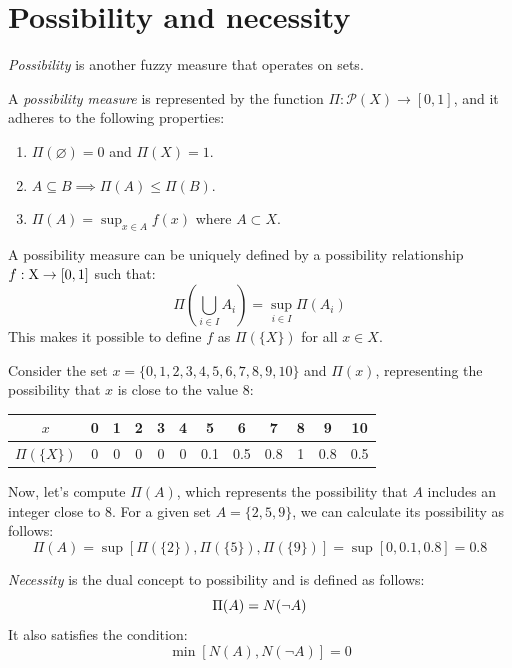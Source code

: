 \documentclass[12pt, a4paper]{report}
\begin{document}
    \section{Possibility and necessity}
    \begin{definition}
        \emph{Possibility} is another fuzzy measure that operates on sets. 
        
        A \emph{possibility measure} is represented by the function $\Pi : \mathcal{P}(X) \rightarrow [0,1]$, and it adheres to the following properties:
        \begin{enumerate}
            \item $\Pi(\varnothing)=0$ and $\Pi(X)=1$.
            \item $A \subseteq B \implies \Pi(A) \leq \Pi(B)$. 
            \item $\Pi(A)=\sup_{x \in A} f(x)$ where $A \subset X$. 
        \end{enumerate}
    \end{definition}
    A possibility measure can be uniquely defined by a possibility relationship $f:\textnormal{X} \rightarrow [0,1]$ such that:
    \[\Pi\left(\bigcup_{i \in I}A_i\right)=\sup_{i \in I}\Pi\left(A_i\right)\]
    This makes it possible to define $f$ as $\Pi\left(\{X\}\right)$ for all $x \in X$.
    \begin{example}
        Consider the set $x=\{0,1,2,3,4,5,6,7,8,9,10\}$ and $\Pi({x})$, representing the possibility that $x$ is close to the value $8$:
        \begin{center}
            \begin{tabular}{|c|c|c|c|c|c|c|c|c|c|c|c|} 
                \hline
                $x$                         & 0 & 1 & 2 & 3 & 4 & 5     & 6     & 7     & 8 & 9     & 10    \\ \hline
                $\Pi\left(\{X\}\right) $    & 0 & 0 & 0 & 0 & 0 & 0.1   & 0.5   & 0.8   & 1 & 0.8   & 0.5   \\ \hline
            \end{tabular}
        \end{center}
        Now, let's compute $\Pi(A)$, which represents the possibility that $A$ includes an integer close to $8$. 
        For a given set $A=\{2,5,9\}$, we can calculate its possibility as follows: 
        \[\Pi(A)=\sup \left[\Pi\left(\{2\}\right), \Pi\left(\{5\}\right), \Pi\left(\{9\}\right)\right]=\sup\left[0,0.1,0.8\right]=0.8\]
    \end{example}
    \begin{definition}
        \emph{Necessity} is the dual concept to possibility and is defined as follows:
        \[\Pi(A)=\-N(\lnot A)\]
        It also satisfies the condition:
        \[\min\left[N(A),N(\lnot A)\right]=0\]
    \end{definition}
\end{document}
